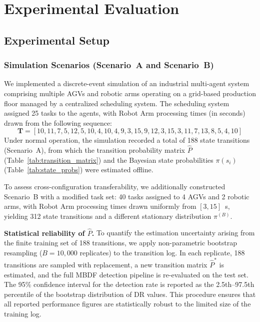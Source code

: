 \documentclass[manuscript,screen,review]{acmart}
\begin{document}
\section{Experimental Evaluation}
\label{sec:experiments}

\subsection{Experimental Setup}
\label{sec:setup}

\subsubsection{Simulation Scenarios (Scenario~A and Scenario~B)}
\label{sec:sim_scenarios}

We implemented a discrete-event simulation of an industrial
multi-agent system comprising multiple AGVs and robotic arms
operating on a grid-based production floor managed by a
centralized scheduling system. The scheduling system assigned
25 tasks to the agents, with Robot Arm processing times (in
seconds) drawn from the following sequence:
\begin{equation}
\mathbf{T} = [10,11,7,5,12,5,10,4,10,4,9,3,15,9,12,
               3,15,3,11,7,13,8,5,4,10]
\label{eq:task_times}
\end{equation}
Under normal operation, the simulation recorded a total of
188 state transitions (Scenario~A), from which the transition
probability matrix $\hat{P}$ (Table~\ref{tab:transition_matrix})
and the Bayesian state probabilities $\pi(s_i)$
(Table~\ref{tab:state_probs}) were estimated offline.

To assess cross-configuration transferability, we additionally
constructed Scenario~B with a modified task set: 40 tasks
assigned to 4 AGVs and 2 robotic arms, with Robot Arm
processing times drawn uniformly from $[3,15]$~s,
yielding 312 state transitions and a different stationary
distribution $\pi^{(B)}$.

\textbf{Statistical reliability of $\hat{P}$.}
To quantify the estimation uncertainty arising from the
finite training set of 188 transitions, we apply
non-parametric bootstrap resampling ($B = 10{,}000$
replicates) to the transition log. In each replicate,
188 transitions are sampled with replacement, a new
transition matrix $\hat{P}^{*}$ is estimated, and the
full MBDF detection pipeline is re-evaluated on the test
set. The 95\% confidence interval for the detection rate
is reported as the 2.5th--97.5th percentile of the
bootstrap distribution of DR values. This procedure
ensures that all reported performance figures are
statistically robust to the limited size of the
training log.
\end{document}
